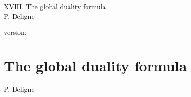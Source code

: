 \documentclass[10pt]{../fichiers-configuration-latex/smfart}
\begin{document}
\begin{center}
XVIII. The global duality formula\\
P. Deligne
\end{center}

version: \showgitstatus
\tableofcontents
\mainmatter

\else
\chapter{The global duality formula}
\begin{center}
P. Deligne
\end{center}
\fi
{}\label{sga4.exp.XVIII}

\renewcommand{\sisi}[2]{#2}
\let\Arrowvert\Vert
















\end{document}
